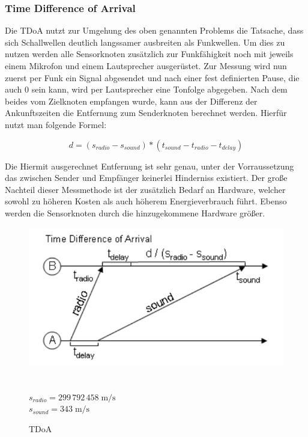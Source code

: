 \subsubsection{Time Difference of Arrival}
Die \ac{TDoA} nutzt zur Umgehung des oben genannten Problems die
Tatsache, dass sich Schallwellen deutlich langssamer ausbreiten als
Funkwellen. Um dies zu nutzen werden alle Sensorknoten zusätzlich zur
Funkfähigkeit noch mit jeweils einem Mikrofon und einem Lautsprecher
ausgerüstet. Zur Messung wird nun zuerst per Funk ein Signal
abgesendet und nach einer fest definierten Pause, die auch 0 sein
kann, wird per Lautsprecher eine Tonfolge abgegeben. Nach dem beides
vom Zielknoten empfangen wurde, kann aus der Differenz der
Ankunftszeiten die Entfernung zum Senderknoten berechnet werden.
Hierfür nutzt man folgende Formel:

\begin{framed}
\begin{equation}
  \label{eq:TDoA}
    d = (s_{radio} - s_{sound}) * (t_{sound} - t_{radio} - t_{delay})
\end{equation}
\end{framed}

Die Hiermit ausgerechnet Entfernung ist sehr genau, unter der Vorraussetzung das zwischen Sender und Empfänger keinerlei Hinderniss existiert. Der große Nachteil dieser Messmethode ist der zusätzlich Bedarf an Hardware, welcher sowohl zu höheren Kosten als auch höherem Energieverbrauch führt. Ebenso werden die Sensorknoten durch die hinzugekommene Hardware größer.
\begin{figure}[h!]
  \centering
  \includegraphics[scale=0.5]{img/tdoa1.png}\\
  \cite{bachrach}\\~\\
  $s_{radio}=299\,792\,458\;\mathrm{m/s}$\\
  $s_{sound}=          343\;\mathrm{m/s}$
  \label{fig:TDoA}
  \caption{TDoA}
\end{figure}

